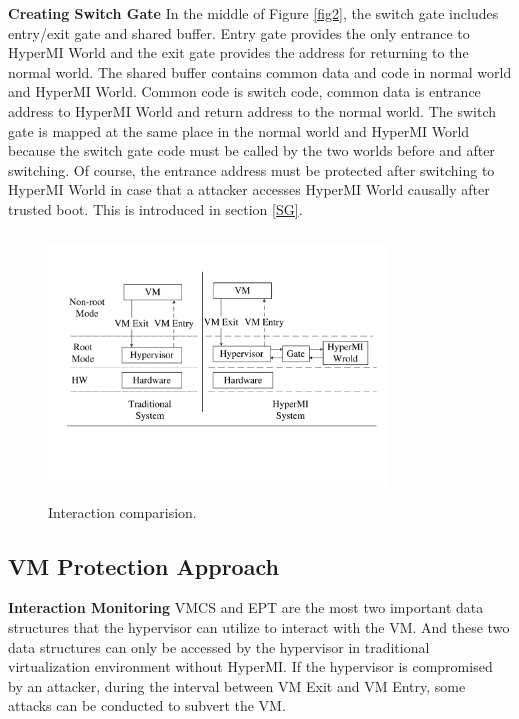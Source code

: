 \documentclass[conference]{IEEEtran}
\begin{document}
\textbf{Creating Switch Gate}
In the middle of Figure \ref{fig2}, the switch gate includes entry/exit gate and shared buffer. Entry gate provides the only entrance to HyperMI World and the exit gate provides the address for returning to the normal world. The shared buffer contains common data and code in normal world and HyperMI World. Common code is switch code, common data is entrance address to HyperMI World and return address to the normal world. The switch gate is mapped at the same place in the normal world and HyperMI World because the switch gate code must be called by the two worlds before and after switching. Of course, the entrance address must be protected after switching to HyperMI World in case that a attacker accesses HyperMI World causally after trusted boot. This is introduced in section \ref{SG}.


\begin{figure}
\centerline{\includegraphics[width=9cm, height=7cm]{pdfvmcsProcess.pdf}}
\caption{Interaction comparision. } \label{fig+1}
\end{figure}


\subsection{VM Protection Approach}

\textbf{Interaction Monitoring}\label {interaction}
 VMCS and EPT are the most two important data structures that the hypervisor can utilize to interact with the VM. And these two data structures can only be accessed by the hypervisor in traditional virtualization environment without HyperMI. If the hypervisor is compromised by an attacker, during the interval between VM Exit and VM Entry, some attacks can be conducted to subvert the VM. 
\end{document}
